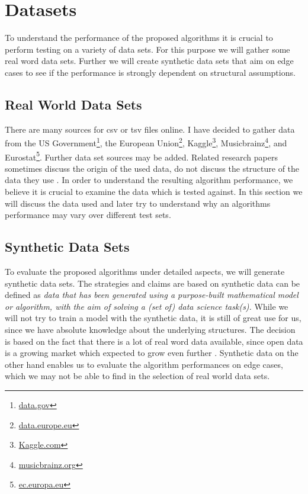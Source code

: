 \chapter{Datasets}
To understand the performance of the proposed algorithms it is crucial to perform testing on a variety of data sets. For this purpose we will gather some real word data sets. Further we will create synthetic data sets that aim on edge cases to see if the performance is strongly dependent on structural assumptions.

\section{Real World Data Sets}
There are many sources for csv or tsv files online. I have decided to gather data from the US Government\footnote{\href{https://data.gov}{data.gov}}, the European Union\footnote{\href{https://data.europe.eu}{data.europe.eu}}, Kaggle\footnote{\href{https://kaggle.com}{Kaggle.com}}, Musicbrainz\footnote{\href{https://musicbrainz.org/}{musicbrainz.org}}, and Eurostat\footnote{\href{https://musicbrainz.org/}{ec.europa.eu}}. Further data set sources may be added. Related research papers sometimes discuss the origin of the used data, do not discuss the structure of the data they use \cite{papenbrock2017data,bauckmann2006efficiently, dursch2019inclusion, rostin2009machine}. In order to understand the resulting algorithm performance, we believe it is crucial to examine the data which is tested against. In this section we will discuss the data used and later try to understand why an algorithms performance may vary over different test sets.

\section{Synthetic Data Sets}
To evaluate the proposed algorithms under detailed aspects, we will generate synthetic data sets. The strategies and claims are based on \cite{jordon2022synthetic} synthetic data can be defined as \textit{data that has been generated using a purpose-built mathematical model or algorithm, with the aim of solving a (set of) data science task(s).} While we will not try to train a model with the synthetic data, it is still of great use for us, since we have absolute knowledge about the underlying structures. The decision is based on the fact that there is a lot of real word data available, since open data is a growing market which expected to grow even further \cite{EUopenData}. Synthetic data on the other hand enables us to evaluate the algorithm performances on edge cases, which we may not be able to find in the selection of real world data sets. \\

